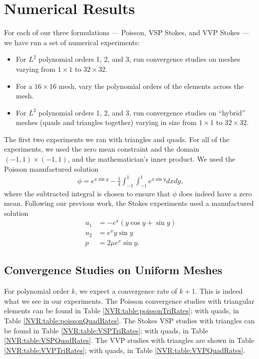 \section{Numerical Results}\label{NVR:sec:numericalResults}
For each of our three formulations --- Poisson, VSP Stokes, and VVP Stokes --- we have run a set of numerical experiments:
\begin{itemize}
\item For $L^{2}$ polynomial orders 1, 2, and 3, run convergence studies on meshes varying from $1 \times 1$ to $32 \times 32$.
\item For a $16 \times 16$ mesh, vary the polynomial orders of the elements across the mesh.
\item For $L^{2}$ polynomial orders 1, 2, and 3, run convergence studies on ``hybrid'' meshes (quads and triangles together) varying in size from $1 \times 1$ to $32 \times 32$.
\end{itemize}

The first two experiments we ran with triangles and quads.  For all of the experiments, we used the zero mean constraint and the domain $(-1,1) \times (-1,1)$, and the mathematician's inner product.  We used the Poisson manufactured solution
\begin{align*}
\phi = e^{x \sin y} - \frac{1}{4} \int_{-1}^{1} \int_{-1}^{1} e^{x \sin y} dx dy,
\end{align*}
where the subtracted integral is chosen to ensure that $\phi$ does indeed have a zero mean.  Following our previous work, the Stokes experiments used a manufactured solution
\begin{align*}
u_{1} &=  -e^{x} ( y \cos y + \sin y )\\
u_{2} &=  e^{x}  y \sin y\\
p &= 2 \mu e^{x} \sin y.
\end{align*}

\subsection{Convergence Studies on Uniform Meshes}
For polynomial order $k$, we expect a convergence rate of $k+1$.  This is indeed what we see in our experiments.  The Poisson convergence studies with triangular elements can be found in Table \ref{NVR:table:poissonTriRates}; with quads, in Table \ref{NVR:table:poissonQuadRates}.  The Stokes VSP studies with triangles can be found in Table \ref{NVR:table:VSPTriRates}; with quads, in Table \ref{NVR:table:VSPQuadRates}.  The VVP studies with triangles are shown in Table \ref{NVR:table:VVPTriRates}; with quads, in Table \ref{NVR:table:VVPQuadRates}.


